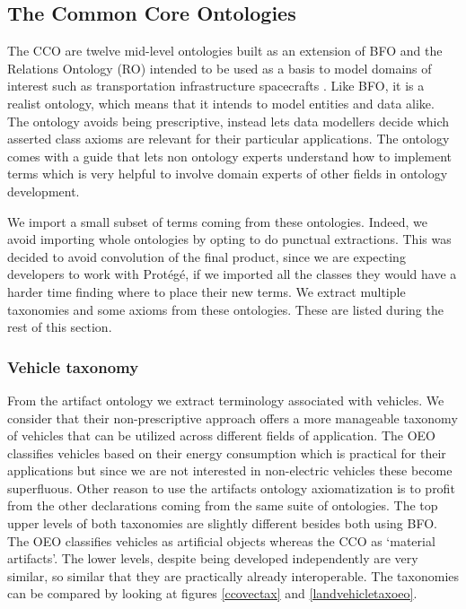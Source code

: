 \subsection{The Common Core Ontologies}

The CCO are twelve mid-level ontologies built as an extension of BFO and the
Relations Ontology (RO) intended to be used as a basis to model domains of
interest such as transportation infrastructure spacecrafts
\cite{Rudnicki.23September2020}. Like BFO, it is a realist ontology, which
means that it intends to model entities and data alike. The ontology avoids
being prescriptive, instead lets data modellers decide which asserted class
axioms are relevant for their particular applications. The ontology comes with
a guide that lets non ontology experts understand how to implement terms which
is very helpful to involve domain experts of other fields in ontology
development.

We import a small subset of terms coming from these ontologies. Indeed, we
avoid importing whole ontologies by opting to do punctual extractions. This was
decided to avoid convolution of the final product, since we are expecting
developers to work with Protégé, if we imported all the classes they would have
a harder time finding where to place their new terms. We extract multiple
taxonomies and some axioms from these ontologies. These are listed during the
rest of this section.

\subsubsection{Vehicle taxonomy}

From the artifact ontology we extract terminology associated with vehicles. We
consider that their non-prescriptive approach offers a more manageable taxonomy
of vehicles that can be utilized across different fields of application. The
OEO classifies vehicles based on their energy consumption which is practical
for their applications but since we are not interested in non-electric vehicles
these become superfluous. Other reason to use the artifacts ontology
axiomatization is to profit from the other declarations coming from the same
suite of ontologies. The top upper levels of both taxonomies are slightly
different besides both using BFO. The OEO classifies vehicles as artificial
objects whereas the CCO as `material artifacts'. The lower levels, despite
being developed independently are very similar, so similar  that they are
practically already interoperable. The taxonomies can be compared by looking at
figures \ref{ccovectax} and \ref{landvehicletaxoeo}.

